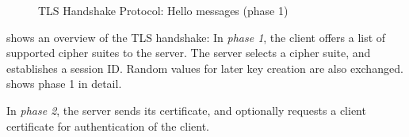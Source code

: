 \begin{figure}
    \centering
    \caption{TLS Handshake Protocol: Hello messages (phase 1)}
    \label{fig:tls_hello}
\end{figure}

 shows an overview of the TLS handshake: In \emph{phase
1}, the client offers a list of supported cipher suites to the server. The
server selects a cipher suite, and establishes a session ID. Random values for
later key creation are also exchanged.  shows phase 1 in
detail.

In \emph{phase 2}, the server sends its certificate, and optionally requests a
client certificate for authentication of the client.

